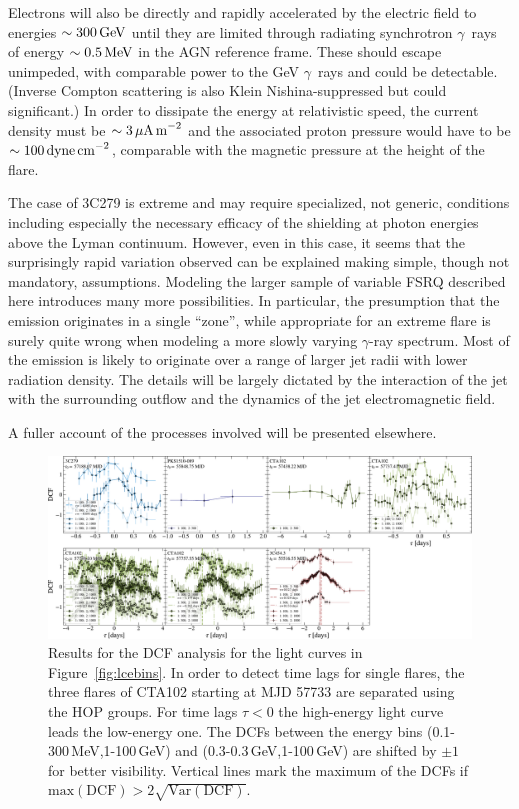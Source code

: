\documentclass[twocolumn,linenumbers]{aastex62}
\newcommand{\Grays}{$\gamma$~rays\xspace}
\newcommand{\gray}{$\gamma$-ray\xspace}
\begin{document}
Electrons will also be directly and rapidly accelerated by the electric field to energies $\sim300\,{\rm GeV}$ until they are limited through radiating synchrotron \Grays of energy $\sim0.5\,{\rm MeV}$ in the AGN reference frame. These should escape unimpeded, with comparable power to the GeV \Grays and could be detectable. (Inverse Compton scattering is also Klein Nishina-suppressed but could significant.) In order to dissipate the energy at relativistic speed, the current density must be $\sim3\,\mu{\rm A\,m}^{-2}$ and the associated proton pressure would have to be $\sim100\,{\rm dyne\,cm}^{-2}$, comparable with the magnetic pressure at the height of the flare.

The  case of 3C279 is extreme and may require specialized, not generic, conditions including especially the necessary efficacy of the shielding at photon energies above the Lyman continuum. However, even in this case, it seems that the surprisingly rapid variation observed can be explained making simple, though not mandatory, assumptions. Modeling the larger sample of variable FSRQ described here introduces many more possibilities. In particular, the presumption that the emission originates in a single ``zone'', while appropriate for an extreme flare is surely quite wrong when modeling a more slowly varying \gray spectrum. Most of the emission is likely to originate over a range of larger jet radii with lower radiation density. The details will be largely dictated by the interaction of the jet with the surrounding outflow and the dynamics of the jet electromagnetic field.

A fuller account of the processes involved will be presented elsewhere.

\begin{figure}
    \centering
    \includegraphics[width = .9 \linewidth]{figures/zdcf_ebins.pdf}
    \caption{Results for the DCF analysis for the light curves in Figure~\ref{fig:lcebins}. In order to detect time lags for single flares, the three flares of CTA102 starting at MJD 57733 are separated using the HOP groups. For time lags $\tau < 0$ the high-energy light curve leads the low-energy one. The DCFs between the energy bins (0.1-300\,MeV,1-100\,GeV) and (0.3-0.3\,GeV,1-100\,GeV) are shifted by $\pm 1$ for better visibility. 
    Vertical lines mark the maximum of the DCFs if $\mathrm{max}(\mathrm{DCF}) > 2 \sqrt{\mathrm{Var}(\mathrm{DCF})}$.}
    \label{fig:zdcf}
\end{figure}
\end{document}
